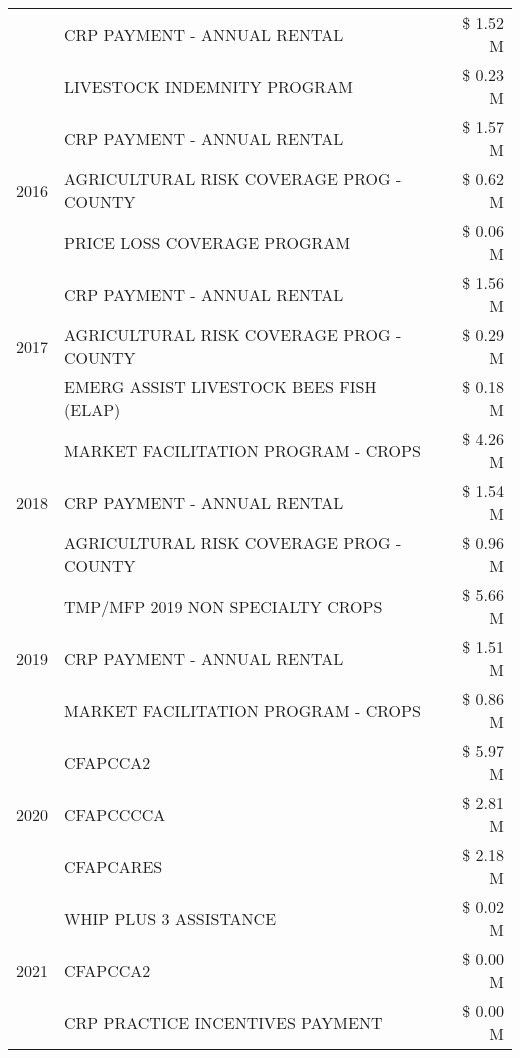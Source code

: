 \begin{tabular}{llr}
 & CRP PAYMENT - ANNUAL RENTAL & \$ 1.52 M \\
 & LIVESTOCK INDEMNITY PROGRAM & \$ 0.23 M \\
\cline{1-3}
\multirow[t]{3}{*}{2016} & CRP PAYMENT - ANNUAL RENTAL & \$ 1.57 M \\
 & AGRICULTURAL RISK COVERAGE PROG - COUNTY & \$ 0.62 M \\
 & PRICE LOSS COVERAGE PROGRAM & \$ 0.06 M \\
\cline{1-3}
\multirow[t]{3}{*}{2017} & CRP PAYMENT - ANNUAL RENTAL & \$ 1.56 M \\
 & AGRICULTURAL RISK COVERAGE PROG - COUNTY & \$ 0.29 M \\
 & EMERG ASSIST LIVESTOCK BEES FISH (ELAP) & \$ 0.18 M \\
\cline{1-3}
\multirow[t]{3}{*}{2018} & MARKET FACILITATION PROGRAM - CROPS & \$ 4.26 M \\
 & CRP PAYMENT - ANNUAL RENTAL & \$ 1.54 M \\
 & AGRICULTURAL RISK COVERAGE PROG - COUNTY & \$ 0.96 M \\
\cline{1-3}
\multirow[t]{3}{*}{2019} & TMP/MFP 2019 NON SPECIALTY CROPS & \$ 5.66 M \\
 & CRP PAYMENT - ANNUAL RENTAL & \$ 1.51 M \\
 & MARKET FACILITATION PROGRAM - CROPS & \$ 0.86 M \\
\cline{1-3}
\multirow[t]{3}{*}{2020} & CFAPCCA2 & \$ 5.97 M \\
 & CFAPCCCCA & \$ 2.81 M \\
 & CFAPCARES & \$ 2.18 M \\
\cline{1-3}
\multirow[t]{3}{*}{2021} & WHIP PLUS 3 ASSISTANCE & \$ 0.02 M \\
 & CFAPCCA2 & \$ 0.00 M \\
 & CRP PRACTICE INCENTIVES PAYMENT & \$ 0.00 M \\
\cline{1-3}
\bottomrule
\end{tabular}
